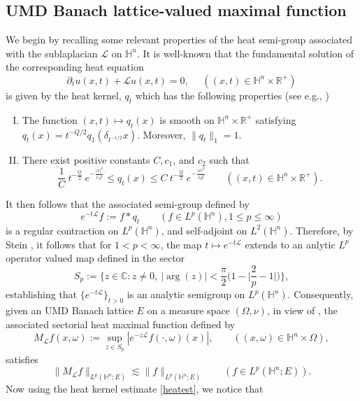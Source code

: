 \documentclass[11pt]{amsart}
\newcommand {\R}{\mathbb R}
\newcommand{\Ha}{\mathbb{H}^n}
\theoremstyle{definition}
\numberwithin{equation}{section}
\begin{document}
\subsection{UMD Banach lattice-valued maximal function}
We begin by recalling some relevant properties of the heat semi-group associated with the sublaplacian $\mathcal{L}$ on $\Ha.$  It is well-known that the fundamental solution of the corresponding heat equation $$\partial_t u(x,t)+ \mathcal{L}u(x,t)=0,\quad\,\,((x,t)\in \Ha\times \R^+)$$
is given by the heat kernel, $q_t$ which has the following properties (see e.g., \cite{FolS})
\begin{enumerate}[(I)]
    \item The function $(x,t)\mapsto q_t(x)$ is smooth on $\Ha\times \R^+$ satisfying \\$q_t(x)=t^{-Q/2} q_1(\delta_{t^{-1/2}}x).$ Moreover, $\|q_t\|_1=1.$
    \item There exist positive constants $C, c_1$, and $c_2$ such that 
    \begin{equation}
        \label{heatest}
        \frac1C~t^{-\frac{Q}{2}}~e^{-\frac{|x|^2}{c_1t}}\leq q_t(x)\leq C ~t^{-\frac{Q}{2}}~e^{-\frac{|x|^2}{c_2t}}\quad\quad ((x,t)\in \Ha\times\R^+).
    \end{equation}
    \end{enumerate}
    It then follows that the associated semi-group defined by $$e^{-t\mathcal{L}}f:=f\ast q_t \quad\quad (f\in L^p(\Ha), 1\leq p\leq \infty)$$
   is a regular contraction on $L^p(\Ha)$, and self-adjoint on $L^2(\Ha).$ Therefore, by Stein \cite[Theorem 1, Section 2, Chapter III]{SteinLP}, it follows that for $1<p<\infty$, the map $t\mapsto e^{-t\mathcal{L}}$ extends to an anlytic $L^p$ operator valued map defined in the sector $$S_p:=\bigg\{z\in\mathbb{C}: z\neq 0,~|\arg (z)|<\frac\pi2 \bigg(1-\bigg|\frac2p-1\bigg|\bigg) \bigg\},$$
   establishing that $\{e^{-t\mathcal{L}}\}_{t>0}$ is an analytic semigroup on $L^p(\Ha).$ Consequently, given an UMD Banach lattice $E$ on a measure space $(\Omega, \nu)$, in view of  \cite[Theorem 2]{X},  the associated sectorial heat maximal function defined by 
   $$M_{\mathcal{L}}f(x, \omega):=\sup_{z\in S_p}|e^{-z\mathcal{L}}f(\cdot,\omega)(x)|,\quad\quad ((x,\omega)\in \Ha\times \Omega),$$
   satisfies 
   \begin{equation}
   \label{heatmaxumd}
       \|M_{\mathcal{L}}f\|_{L^p(\Ha; E)}\lesssim \|f\|_{L^p(\Ha; E)}\quad\quad (f\in L^p(\Ha; E)).
   \end{equation}
   Now using the heat kernel estimate \eqref{heatest}, we notice that 
\end{document}

